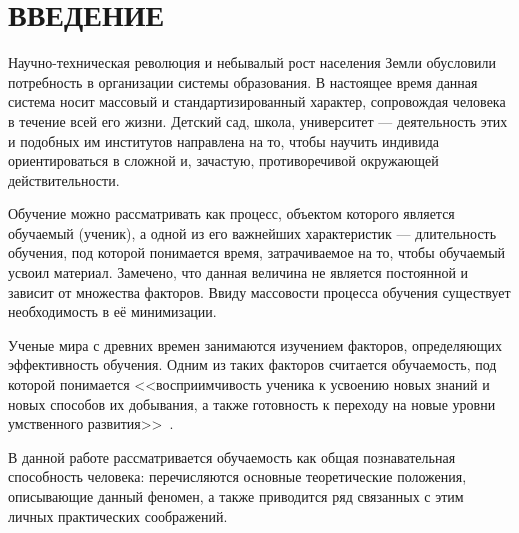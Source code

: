 \section*{ВВЕДЕНИЕ}

Научно-техническая революция и небывалый рост населения Земли обусловили
потребность в организации системы образования.
В настоящее время данная система носит массовый и стандартизированный характер,
сопровождая человека в течение всей его жизни.
Детский сад, школа, университет --- деятельность этих и подобных им
институтов направлена на то,
чтобы научить индивида ориентироваться в сложной и, зачастую,
противоречивой окружающей действительности.

Обучение можно рассматривать как процесс, объектом которого является
обучаемый (ученик), а одной из его важнейших характеристик ---
длительность обучения, под которой понимается время, затрачиваемое на то,
чтобы обучаемый усвоил материал.
Замечено, что данная величина не является постоянной и зависит от множества факторов.
Ввиду массовости процесса обучения существует необходимость в её минимизации.

Ученые мира с древних времен занимаются изучением факторов,
определяющих эффективность обучения.
Одним из таких факторов считается обучаемость, под которой понимается
<<восприимчивость ученика к усвоению новых знаний и новых способов их добывания,
а также готовность к переходу на новые уровни умственного развития>>~\cite{markova1990}.

В данной работе рассматривается обучаемость как общая познавательная способность человека:
перечисляются основные теоретические положения, описывающие данный феномен,
а также приводится ряд связанных с этим личных практических соображений.

